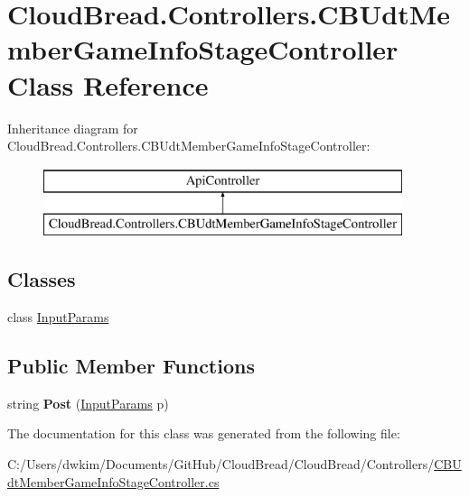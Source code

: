\hypertarget{class_cloud_bread_1_1_controllers_1_1_c_b_udt_member_game_info_stage_controller}{}\section{Cloud\+Bread.\+Controllers.\+C\+B\+Udt\+Member\+Game\+Info\+Stage\+Controller Class Reference}
\label{class_cloud_bread_1_1_controllers_1_1_c_b_udt_member_game_info_stage_controller}
Inheritance diagram for Cloud\+Bread.\+Controllers.\+C\+B\+Udt\+Member\+Game\+Info\+Stage\+Controller\+:\begin{figure}[H]
\begin{center}
\leavevmode
\includegraphics[height=2.000000cm]{class_cloud_bread_1_1_controllers_1_1_c_b_udt_member_game_info_stage_controller}
\end{center}
\end{figure}
\subsection*{Classes}
\begin{DoxyCompactItemize}
\item 
class \hyperlink{class_cloud_bread_1_1_controllers_1_1_c_b_udt_member_game_info_stage_controller_1_1_input_params}{Input\+Params}
\end{DoxyCompactItemize}
\subsection*{Public Member Functions}
\begin{DoxyCompactItemize}
\item 
string {\bfseries Post} (\hyperlink{class_cloud_bread_1_1_controllers_1_1_c_b_udt_member_game_info_stage_controller_1_1_input_params}{Input\+Params} p)\hypertarget{class_cloud_bread_1_1_controllers_1_1_c_b_udt_member_game_info_stage_controller_a5592ec08155ea3fb8a2484b2f430f5e4}{}\label{class_cloud_bread_1_1_controllers_1_1_c_b_udt_member_game_info_stage_controller_a5592ec08155ea3fb8a2484b2f430f5e4}

\end{DoxyCompactItemize}


The documentation for this class was generated from the following file\+:\begin{DoxyCompactItemize}
\item 
C\+:/\+Users/dwkim/\+Documents/\+Git\+Hub/\+Cloud\+Bread/\+Cloud\+Bread/\+Controllers/\hyperlink{_c_b_udt_member_game_info_stage_controller_8cs}{C\+B\+Udt\+Member\+Game\+Info\+Stage\+Controller.\+cs}\end{DoxyCompactItemize}
